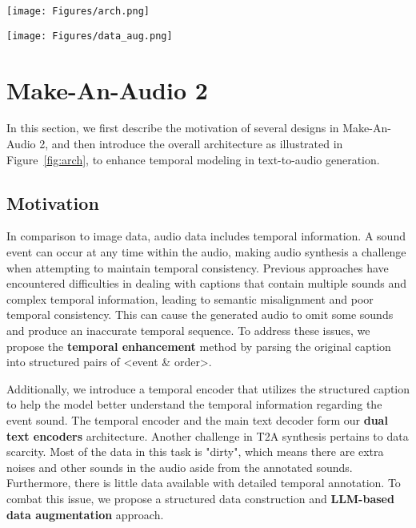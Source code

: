 \documentclass{article}
\begin{document}
\begin{figure*}[!t]
    \centering
    \texttt{[image: Figures/arch.png]}
    \caption{A high-level overview of Make-An-Audio 2. Note that modules printed with a \textit{lock} are frozen when training the T2A model.} 
    \label{fig:arch}
\end{figure*}

\begin{figure*}[!t]
    \centering
    \texttt{[image: Figures/data\_aug.png]}
    \caption{Overview of LLM-based data augmentation. We use single-labeled audios and their labels as a database. Composing complex audios and the structured captions with these data. We then use LLM to generate diverse natural language captions by the constructed captions and appropriate prompt.} 
    \label{fig:data_aug}
\end{figure*} \section{Make-An-Audio 2}
In this section, we first describe the motivation of several designs in Make-An-Audio 2, and then introduce the overall architecture as illustrated in Figure~\ref{fig:arch}, to enhance temporal modeling in text-to-audio generation. 


\subsection{Motivation}
In comparison to image data, audio data includes temporal information. A sound event can occur at any time within the audio, making audio synthesis a challenge when attempting to maintain temporal consistency. Previous approaches have encountered difficulties in dealing with captions that contain multiple sounds and complex temporal information, leading to semantic misalignment and poor temporal consistency. This can cause the generated audio to omit some sounds and produce an inaccurate temporal sequence. To address these issues, we propose the \textbf{temporal enhancement} method by parsing the original caption into structured pairs of <event \& order>. 

Additionally, we introduce a temporal encoder that utilizes the structured caption to help the model better understand the temporal information regarding the event sound. The temporal encoder and the main text decoder form our \textbf{dual text encoders} architecture.
Another challenge in T2A synthesis pertains to data scarcity. Most of the data in this task is "dirty", which means there are extra noises and other sounds in the audio aside from the annotated sounds. Furthermore, there is little data available with detailed temporal annotation. To combat this issue, we propose a structured data construction and \textbf{LLM-based data augmentation} approach. 
\end{document}
